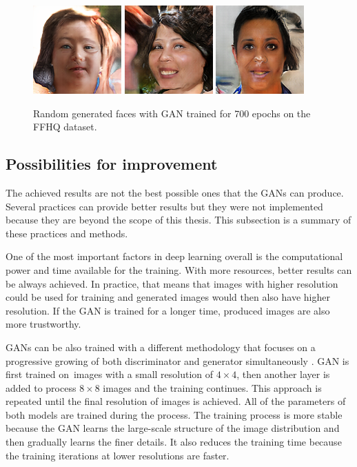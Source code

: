 \begin{figure}[!h]
{        \includegraphics[scale=0.485]{figures/ffhq/random/ffhq128x128_image0006.png}
        \includegraphics[scale=0.485]{figures/ffhq/random/ffhq128x128_image0007.png}
        \includegraphics[scale=0.485]{figures/ffhq/random/ffhq128x128_image0008.png}
    }
    \caption{\label{fig:ffhq-good}Random generated faces with GAN trained for 700 epochs on the FFHQ dataset.}
\end{figure}

\subsection*{Possibilities for improvement}
The achieved results are not the best possible ones that the GANs can produce. Several practices can provide better results but they were not implemented because they are beyond the scope of this thesis. This subsection is a summary of these practices and methods.

One of the most important factors in deep learning overall is the computational power and time available for the training. With more resources, better results can be always achieved. In practice, that means that images with higher resolution could be used for training and generated images would then also have higher resolution. If the GAN is trained for a longer time, produced images are also more trustworthy.

GANs can be also trained with a different methodology that focuses on a progressive growing of both discriminator and generator simultaneously \cite{karras2017progressive}. GAN is first trained on~images with a small resolution of $4 \times 4$, then another layer is added to process $8 \times 8$ images and the training continues. This approach is repeated until the final resolution of images is achieved. All of the parameters of both models are trained during the process. The training process is more stable because the GAN learns the large-scale structure of the image distribution and then gradually learns the finer details. It also reduces the training time because the training iterations at lower resolutions are faster.

